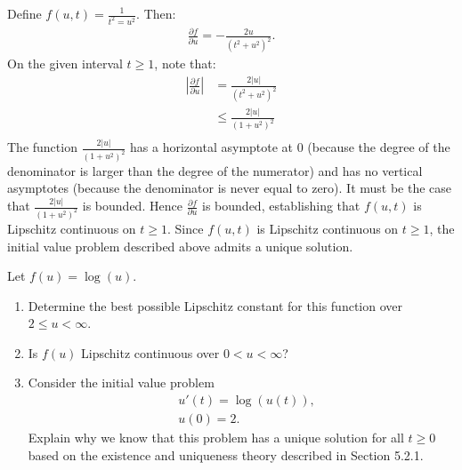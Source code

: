 \documentclass[10pt,oneside,openany]{memoir}
\begin{document}
    \begin{solution}
        Define $f(u,t) = \frac{1}{t^2 = u^2}$. Then:
            \begin{equation*}
            \begin{split}
                \frac{\partial f}{\partial u} =-\frac{2u}{(t^2 + u^2)^2}.
            \end{split}
            \end{equation*}
        On the given interval $t \geq 1$, note that:
            \begin{equation*}
            \begin{split}
                \left| \frac{\partial f}{\partial u} \right|
                & = \frac{2|u|}{(t^2 + u^2)^2} \\
                & \leq \frac{2|u|}{(1 + u^2)^2} \\
            \end{split}
            \end{equation*}
        The function $\frac{2|u|}{(1+u^2)^2}$ has a horizontal asymptote at 0 (because the degree of the denominator is larger than the degree of the numerator) and has no vertical asymptotes (because the denominator is never equal to zero). It must be the case that $\frac{2|u|}{(1+u^2)^2}$ is bounded. Hence $\frac{\partial f}{\partial u}$ is bounded, establishing that $f(u,t)$ is Lipschitz continuous on $t \geq 1$. Since $f(u,t)$ is Lipschitz continuous on $t \geq 1$, the initial value problem described above admits a unique solution.
    \end{solution}
\begin{exercise}[manual-num={5.2}]
Let $f(u) = \log(u)$.
\begin{enumerate}[label = (\alph*),itemsep=1pt,topsep=3pt]
    \item Determine the best possible Lipschitz constant for this function over $2 \leq u < \infty$.
    \item Is $f(u)$ Lipschitz continuous over $0 < u < \infty$?
    \item Consider the initial value problem
        \begin{equation*}
        \begin{split}
            &u'(t) = \log(u(t)), \\
            &u(0) = 2.
        \end{split}
        \end{equation*}
    Explain why we know that this problem has a unique solution for all $t \geq 0$ based on the existence and uniqueness theory described in Section 5.2.1.
\end{enumerate}
\end{exercise}
\end{document}
